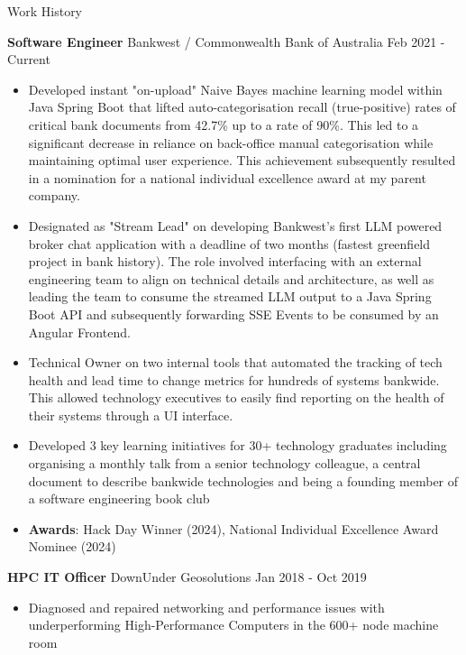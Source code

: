 \documentclass{resume} %
\begin{document}
	\begin{rSection}{Work History}
		\vspace{-0.8em}
		\item \textbf{Software Engineer} {Bankwest / Commonwealth Bank of Australia} \hfill Feb 2021 - Current
		\begin{itemize} 
			\item Developed instant "on-upload" Naive Bayes machine learning model within Java Spring Boot that lifted auto-categorisation recall (true-positive) rates of critical bank documents from 42.7\% up to a rate of 90\%. This led to a significant decrease in reliance on back-office manual categorisation while maintaining optimal user experience. This achievement subsequently resulted in a nomination for a national individual excellence award at my parent company.
			\item Designated as "Stream Lead" on developing Bankwest's first LLM powered broker chat application with a deadline of two months (fastest greenfield project in bank history). The role involved interfacing with an external engineering team to align on technical details and architecture, as well as leading the team to consume the streamed LLM output to a Java Spring Boot API and subsequently forwarding SSE Events to be consumed by an Angular Frontend.
			\item Technical Owner on two internal tools that automated the tracking of tech health and lead time to change metrics
for hundreds of systems bankwide. This allowed technology executives to easily find reporting on the health of their systems
through a UI interface.		
			\item Developed 3 key learning initiatives for 30+ technology graduates including organising a monthly talk from
a senior technology colleague, a central document to describe bankwide technologies and being a founding
member of a software engineering book club
			\item \textbf{Awards}: Hack Day Winner (2024), National Individual Excellence Award Nominee (2024) 
		\end{itemize}
		
		\item \textbf{HPC IT Officer} {DownUnder Geosolutions} \hfill Jan 2018 - Oct 2019
		\begin{itemize} 

			\item  Diagnosed and repaired networking and performance issues with underperforming High-Performance Computers in the 600+ node machine room
		\end{itemize}

	\end{rSection} 
\end{document}
